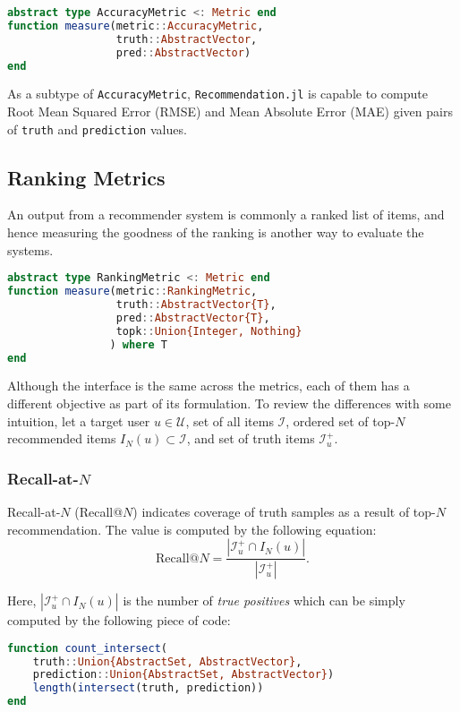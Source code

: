 \begin{lstlisting}[language = Julia]
abstract type AccuracyMetric <: Metric end
function measure(metric::AccuracyMetric, 
                 truth::AbstractVector, 
                 pred::AbstractVector)
end  
\end{lstlisting}

As a subtype of \texttt{AccuracyMetric}, \texttt{Recommendation.jl} is capable to compute Root Mean Squared Error (RMSE) and Mean Absolute Error (MAE) given pairs of \texttt{truth} and \texttt{prediction} values.

\subsection{Ranking Metrics}
\label{sec:ranking-metrics}

An output from a recommender system is commonly a ranked list of items, and hence measuring the goodness of the ranking is another way to evaluate the systems. 

\begin{lstlisting}[language = Julia]
abstract type RankingMetric <: Metric end
function measure(metric::RankingMetric, 
                 truth::AbstractVector{T}, 
                 pred::AbstractVector{T}, 
                 topk::Union{Integer, Nothing}
                ) where T
end
\end{lstlisting}

Although the interface is the same across the metrics, each of them has a different objective as part of its formulation. To review the differences with some intuition, let a target user $u \in \mathcal{U}$, set of all items $\mathcal{I}$, ordered set of top-$N$ recommended items $I_N(u) \subset \mathcal{I}$, and set of truth items $\mathcal{I}^+_u$. 

\subsubsection{Recall-at-$N$}

Recall-at-$N$ (Recall@$N$) indicates coverage of truth samples as a result of top-$N$ recommendation. The value is computed by the following equation:
$$
\mathrm{Recall@}N = \frac{|\mathcal{I}^+_u \cap I_N(u)|}{|\mathcal{I}^+_u|}.
$$

Here, $|\mathcal{I}^+_u \cap I_N(u)|$ is the number of \textit{true positives} which can be simply computed by the following piece of code:

\begin{lstlisting}[language = Julia]
function count_intersect(
    truth::Union{AbstractSet, AbstractVector}, 
    prediction::Union{AbstractSet, AbstractVector})
    length(intersect(truth, prediction))
end
\end{lstlisting}

